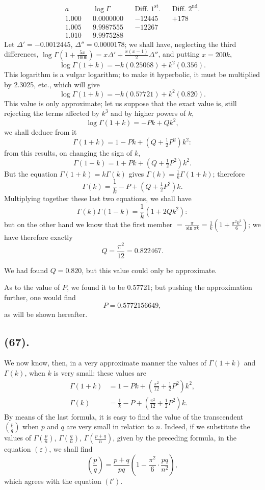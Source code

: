 \documentclass{article}
\begin{document}
\[ \begin{aligned} a && \log\Gamma && \text{Diff. }1^{\text{st}}. && \text{Diff. }2^{\text{nd}}.\\ 1.000 && 0.0000000 && -12445 && +178\\ 1.005 && 9.9987555 && -12267 &&\\ 1.010 && 9.9975288 && && \end{aligned} \]
Let $\Delta'=-0.0012445$, $\Delta''=0.0000178$; we shall have, neglecting the third differences, $\log\Gamma\left(1+\frac{5x}{1000}\right)=x\Delta'+\frac{x(x-1)}{2}\Delta''$, and putting $x=200k$,
\[ \log\Gamma(1+k)=-k(0.25068)+k^{2}(0.356). \]
This logarithm is a vulgar logarithm; to make it hyperbolic, it must be multiplied by 2.3025, etc., which will give
\[ \log\Gamma(1+k)=-k(0.57721)+k^{2}(0.820). \]
This value is only approximate; let us suppose that the exact value is, still rejecting the terms affected by $k^{3}$ and by higher powers of $k$,
\[ \log\Gamma(1+k)=-Pk+Qk^{2}, \]
we shall deduce from it
\[ \Gamma(1+k)=1-Pk+(Q+\tfrac{1}{2}P^{2})k^{2}: \]
from this results, on changing the sign of $k$,
\[ \Gamma(1-k)=1+Pk+(Q+\tfrac{1}{2}P^{2})k^{2}. \]
But the equation $\Gamma(1+k)=k\Gamma(k)$ gives $\Gamma(k)=\frac{1}{k}\Gamma(1+k)$; therefore
\[ \Gamma(k)=\frac{1}{k}-P+(Q+\tfrac{1}{2}P^{2})k. \]
Multiplying together these last two equations, we shall have
\[ \Gamma(k)\Gamma(1-k)=\frac{1}{k}(1+2Qk^{2}): \]
but on the other hand we know that the first member $=\frac{\pi}{\sin\pi k}=\frac{1}{k}\left(1+\frac{\pi^{2}k^{2}}{6}\right)$; we have therefore exactly
\[ Q=\frac{\pi^{2}}{12}=0.822467. \]

We had found $Q=0.820$, but this value could only be approximate.

As to the value of $P$, we found it to be 0.57721; but pushing the approximation further, one would find
\[ P=0.5772156649, \]
as will be shown hereafter.

\subsection*{(67).}

We now know, then, in a very approximate manner the values of $\Gamma(1+k)$ and $\Gamma(k)$, when $k$ is very small: these values are
\[ \begin{aligned} \Gamma(1+k)&=1-Pk+\left(\tfrac{\pi^{2}}{12}+\tfrac{1}{2}P^{2}\right)k^{2},\\ \Gamma(k)&=\frac{1}{k}-P+\left(\tfrac{\pi^{2}}{12}+\tfrac{1}{2}P^{2}\right)k. \end{aligned} \]
By means of the last formula, it is easy to find the value of the transcendent $\left(\frac{p}{q}\right)$ when $p$ and $q$ are very small in relation to $n$. Indeed, if we substitute the values of $\Gamma\left(\frac{p}{n}\right)$, $\Gamma\left(\frac{q}{n}\right)$, $\Gamma\left(\frac{p+q}{n}\right)$, given by the preceding formula, in the equation $(\varepsilon)$, we shall find
\[ \left(\frac{p}{q}\right)=\frac{p+q}{pq}\left(1-\frac{\pi^{2}}{6}\cdot\frac{pq}{n^{2}}\right), \]
which agrees with the equation $(l')$.
\end{document}
